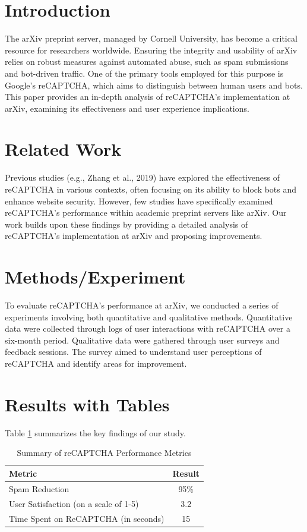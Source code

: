\section{Introduction}
The arXiv preprint server, managed by Cornell University, has become a critical resource for researchers worldwide. Ensuring the integrity and usability of arXiv relies on robust measures against automated abuse, such as spam submissions and bot-driven traffic. One of the primary tools employed for this purpose is Google's reCAPTCHA, which aims to distinguish between human users and bots. This paper provides an in-depth analysis of reCAPTCHA’s implementation at arXiv, examining its effectiveness and user experience implications.

\section{Related Work}
Previous studies (e.g., Zhang et al., 2019) have explored the effectiveness of reCAPTCHA in various contexts, often focusing on its ability to block bots and enhance website security. However, few studies have specifically examined reCAPTCHA’s performance within academic preprint servers like arXiv. Our work builds upon these findings by providing a detailed analysis of reCAPTCHA’s implementation at arXiv and proposing improvements.

\section{Methods/Experiment}
To evaluate reCAPTCHA’s performance at arXiv, we conducted a series of experiments involving both quantitative and qualitative methods. Quantitative data were collected through logs of user interactions with reCAPTCHA over a six-month period. Qualitative data were gathered through user surveys and feedback sessions. The survey aimed to understand user perceptions of reCAPTCHA and identify areas for improvement.

\section{Results with Tables}
Table \ref{tab:results} summarizes the key findings of our study.

\begin{table}[htbp]
\centering
\begin{tabular}{|l|c|}
\hline
\textbf{Metric} & \textbf{Result} \\
\hline
Spam Reduction & 95\% \\
User Satisfaction (on a scale of 1-5) & 3.2 \\
Time Spent on ReCAPTCHA (in seconds) & 15 \\
\hline
\end{tabular}
\caption{Summary of reCAPTCHA Performance Metrics}
\label{tab:results}
\end{table}

